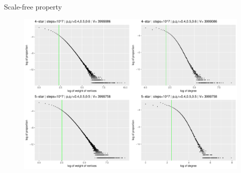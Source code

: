 \begin{block}{Scale-free property}
\begin{figure}
\includegraphics[width=0.8\linewidth]{./fig/csilldist4.pdf}
\end{figure}
\end{block}
